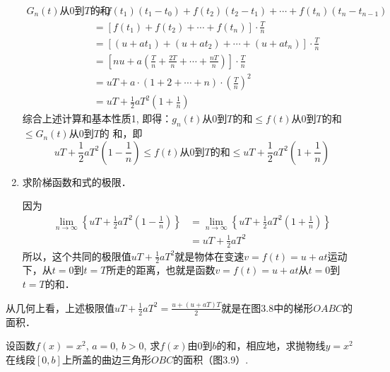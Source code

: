 \begin{solution}
\begin{enumerate}
\[\begin{split}
    \text{$G_n(t)$从0到$T$的和}&=f(t_1)(t_1-t_0)+f(t_2)(t_2-t_1)+\cdots+f(t_n)(t_n-t_{n-1})  \\
   &= \left[f(t_1)+f(t_2)+\cdots+f(t_{n})\right]\cdot \frac{T}{n}\\
    &=\left[(u+at_1)+(u+at_2)+\cdots +(u+at_{n})\right]\cdot \frac{T}{n}\\
    &=\left[nu+a\left(\frac{T}{n}+\frac{2T}{n}+\cdots+\frac{nT}{n}\right)\right]\cdot \frac{T}{n}\\
    &=uT+a\cdot (1+2+\cdots+n)\cdot \left(\frac{T}{n}\right)^2\\
    &=uT+\frac{1}{2}aT^2\left(1+\frac{1}{n}\right)
    \end{split}\]
综合上述计算和基本性质1, 即得：$g_n(t)$从0到$T$的和$\le f(t)$从0到$T$的和$\le G_n(t)$从0到$T$的
和，即
\[uT+\frac{1}{2}aT^2\left(1-\frac{1}{n}\right)\le f(t)
\text{从0到$T$的和}\le uT+\frac{1}{2}aT^2\left(1+\frac{1}{n}\right)\]

\item 求阶梯函数和式的极限．

因为
\[\begin{split}
    \lim_{n\to\infty}\left\{uT+\frac{1}{2}aT^2\left(1-\frac{1}{n}\right)\right\}&=\lim_{n\to\infty}\left\{uT+\frac{1}{2}aT^2\left(1+\frac{1}{n}\right)\right\}\\
    &=uT+\frac{1}{2}aT^2
\end{split}\]
所以，这个共同的极限值$uT+\frac{1}{2}aT^2$就是物体在变速$v=f(t)=u+at$运动下，从$t=0$到$t=T$所走的距离，也就是函数$v=f(t)=u+at$从$t=0$到$t=T$的和．
\end{enumerate}

从几何上看，上述极限值$uT+\frac{1}{2}aT^2=\frac{u+(u+aT)T}{2}$就是在图3.8中的梯形$OABC$的面积．
\end{solution}    

\begin{example}
    设函数$f(x)=x^2$, $a=0$, $b>0$, 求$f(x)$由0到$b$的和，相应地，求抛物线$y=x^2$在线段$[0,b]$上所盖的曲边三角形$OBC$的面积（图3.9）.
\end{example}

\begin{figure}[htp]
    \centering
{}
    \caption{}
\end{figure}


